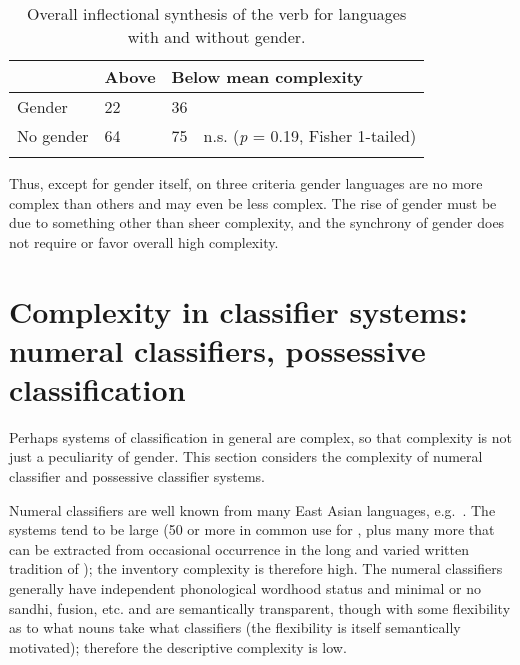 \documentclass[output=collectionpaper]{langsci/langscibook}
\begin{document}
\begin{table}
\caption{Overall inflectional synthesis of the verb for languages with and without gender.}
\label{extab:}

\begin{tabularx}{\textwidth}{p{2.7cm}Xp{1.3cm}l}
\lsptoprule
		 &	Above 	 &	\multicolumn{2}{l}{Below mean complexity} \\
			 \midrule
	Gender	 &	22	 &	36 \\
	No gender  &	64	 &	75	 &	n.s. (\textit{p} = 0.19, Fisher 1-tailed) \\
\lspbottomrule\end{tabularx}
\end{table}

  
Thus, except for gender itself, on three criteria gender languages are no more complex than others and may even be less complex. The rise of gender must be due to something other than sheer complexity, and the synchrony of gender does not require or favor overall high complexity.


\section{Complexity in classifier systems: numeral classifiers, possessive classification}
\label{sec:Nich:4}

Perhaps systems of classification in general are complex, so that complexity is not just a peculiarity of gender. This section considers the complexity of numeral classifier and possessive classifier systems.

	Numeral classifiers are well known from many East Asian languages, e.g.\ . The systems tend to be large (50 or more in common use for , plus many more that can be extracted from occasional occurrence in the long and varied written tradition of ); the inventory complexity is therefore high. The numeral classifiers generally have independent phonological wordhood status and minimal or no sandhi, fusion, etc. and are semantically transparent, though with some flexibility as to what nouns take what classifiers (the flexibility is itself semantically motivated); therefore the descriptive complexity is low.
\end{document}
